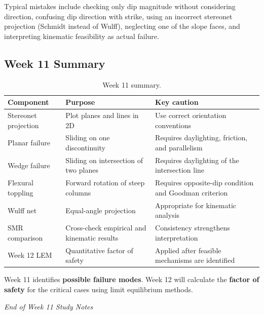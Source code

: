 \documentclass[a4paper,12pt]{article}
\begin{document}
\begin{warnbox}
Typical mistakes include checking only dip magnitude without considering direction, confusing dip direction with strike, using an incorrect stereonet projection (Schmidt instead of Wulff), neglecting one of the slope faces, and interpreting kinematic feasibility as actual failure.
\end{warnbox}

\subsection{Week 11 Summary}

\begin{table}[h!]
\centering
\begin{tabularx}{\textwidth}{l X X}
\toprule
\textbf{Component} & \textbf{Purpose} & \textbf{Key caution} \\
\midrule
Stereonet projection & Plot planes and lines in 2D & Use correct orientation conventions \\
Planar failure & Sliding on one discontinuity & Requires daylighting, friction, and parallelism \\
Wedge failure & Sliding on intersection of two planes & Requires daylighting of the intersection line \\
Flexural toppling & Forward rotation of steep columns & Requires opposite-dip condition and Goodman criterion \\
Wulff net & Equal-angle projection & Appropriate for kinematic analysis \\
SMR comparison & Cross-check empirical and kinematic results & Consistency strengthens interpretation \\
Week 12 LEM & Quantitative factor of safety & Applied after feasible mechanisms are identified \\
\bottomrule
\end{tabularx}
\caption{Week 11 summary.}
\end{table}

\begin{notebox}
Week 11 identifies \textbf{possible failure modes}. Week 12 will calculate the \textbf{factor of safety} for the critical cases using limit equilibrium methods.
\end{notebox}

\vspace{1cm}
\noindent\textit{End of Week 11 Study Notes}
\end{document}

